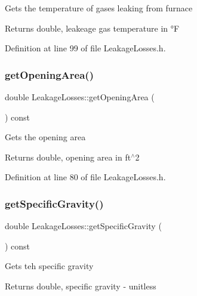 Gets the temperature of gases leaking from furnace

\begin{DoxyReturn}{Returns}
double, leakeage gas temperature in °F 
\end{DoxyReturn}


Definition at line 99 of file Leakage\+Losses.\+h.

\mbox{\label{class_leakage_losses_a6b31fbefaa16a5a52ce423b9531e84fa}} 
\subsubsection{\texorpdfstring{get\+Opening\+Area()}{getOpeningArea()}}
{\footnotesize\ttfamily double Leakage\+Losses\+::get\+Opening\+Area (\begin{DoxyParamCaption}{ }\end{DoxyParamCaption}) const\hspace{0.3cm}{\ttfamily [inline]}}

Gets the opening area

\begin{DoxyReturn}{Returns}
double, opening area in ft$^\wedge$2 
\end{DoxyReturn}


Definition at line 80 of file Leakage\+Losses.\+h.

\mbox{\label{class_leakage_losses_a37cd8c2282547246bab395424dad51d9}} 
\subsubsection{\texorpdfstring{get\+Specific\+Gravity()}{getSpecificGravity()}}
{\footnotesize\ttfamily double Leakage\+Losses\+::get\+Specific\+Gravity (\begin{DoxyParamCaption}{ }\end{DoxyParamCaption}) const\hspace{0.3cm}{\ttfamily [inline]}}

Gets teh specific gravity

\begin{DoxyReturn}{Returns}
double, specific gravity -\/ unitless 
\end{DoxyReturn}


